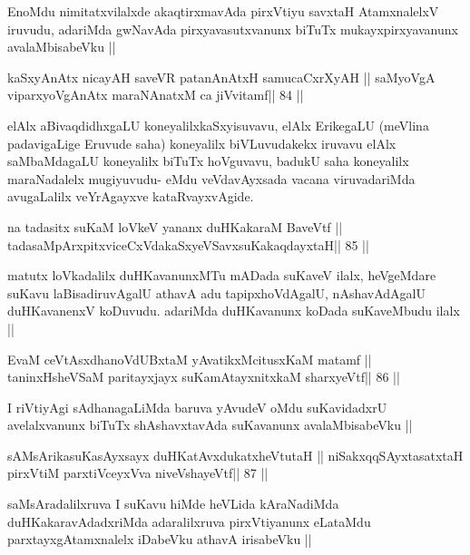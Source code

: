 \begin{artha}
EnoMdu nimitatxvilalxde akaqtirxmavAda pirxVtiyu savxtaH AtamxnalelxV
iruvudu, adariMda gwNavAda pirxyavasutxvanunx biTuTx
mukayxpirxyavanunx avalaMbisabeVku ||
\end{artha}

\begin{shl}
kaSxyAnAtx nicayAH saveVR patanAnAtxH samucaCxrXyAH ||
saMyoVgA viparxyoVgAnAtx maraNAnatxM ca jiVvitamf\hfill || 84 ||
\end{shl}

\begin{artha}
elAlx aBivaqdidhxgaLU koneyalilxkaSxyisuvavu, elAlx ErikegaLU (meVlina
padavigaLige Eruvude saha) koneyalilx biVLuvudakekx iruvavu elAlx
saMbaMdagaLU koneyalilx biTuTx hoVguvavu, badukU saha koneyalilx
maraNadalelx mugiyuvudu- eMdu veVdavAyxsada vacana viruvadariMda
avugaLalilx veYrAgayxve kataRvayxvAgide.
\end{artha}

\begin{shl}
na tadasitx suKaM loVkeV yananx duHKakaraM BaveVtf ||
tadasaMpArxpitxviceCxVdakaSxyeVSavxsuKakaqdayxtaH\hfill || 85 ||
\end{shl}

\begin{artha}
matutx loVkadalilx duHKavanunxMTu mADada suKaveV ilalx, heVgeMdare
suKavu laBisadiruvAgalU athavA adu tapipxhoVdAgalU, nAshavAdAgalU
duHKavanenxV koDuvudu. adariMda duHKavanunx koDada suKaveMbudu ilalx ||
\end{artha}

\begin{shl}
EvaM ceVtAsxdhanoVdUBxtaM yAvatikxMcitusxKaM matamf ||
taninxHsheVSaM paritayxjayx suKamAtayxnitxkaM sharxyeVtf\hfill || 86 ||
\end{shl}

\begin{artha}
I riVtiyAgi sAdhanagaLiMda baruva yAvudeV oMdu suKavidadxrU
avelalxvanunx biTuTx shAshavxtavAda suKavanunx avalaMbisabeVku ||
\end{artha}

\begin{shl}
sAMsArikasuKasAyxsayx duHKatAvxdukatxheVtutaH ||
niSakxqqSAyxtasatxtaH pirxVtiM parxtiVceyxVva niveVshayeVtf\hfill || 87 ||
\end{shl}

\begin{artha}
saMsAradalilxruva I suKavu hiMde heVLida kAraNadiMda
duHKakaravAdadxriMda adaralilxruva pirxVtiyanunx eLataMdu
parxtayxgAtamxnalelx iDabeVku athavA irisabeVku ||
\end{artha}

